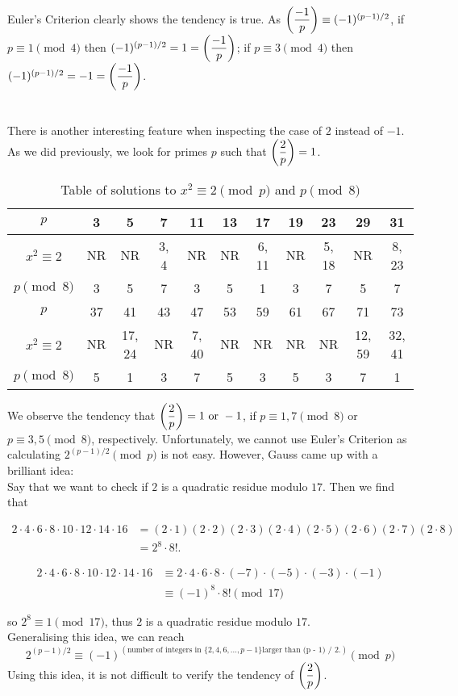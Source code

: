 \noindent
Euler's Criterion clearly shows the tendency is true. As $\left( \dfrac{-1}{p} \right) \equiv (-1)^{(p - 1) / 2}$, if $p\equiv 1\pmod{4}$ then $(-1)^{(p - 1) / 2} = 1 = \left( \dfrac{-1}{p} \right) $; if $p\equiv 3\pmod{4}$ then $(-1)^{(p - 1) / 2} = -1 = \left( \dfrac{-1}{p} \right) $. \\
\\
\\
There is another interesting feature when inspecting the case of $2$ instead of $-1$. As we did previously, we look for primes $p$ such that $\left( \dfrac{2}{p} \right)  = 1$.

\begin{table}[h!]
\centering
\begin{tabular}{|c||c c c c c c c c c c|} 
  \hline
  $p$ & 3 & 5 & 7 & 11 & 13 & 17 & 19 & 23 & 29 & 31 \\
  \hline
  $x^{2}\equiv 2$ & NR & NR & 3, 4 & NR & NR & 6, 11 & NR & 5, 18 & NR & 8, 23 \\ 
  \hline
  $p\pmod{8}$ & 3 & 5 & 7 & 3 & 5 & 1 & 3 & 7 & 5 & 7 \\
  \hline \hline
  $p$ & 37 & 41 & 43 & 47 & 53 & 59 & 61 & 67 & 71 & 73 \\
  \hline
  $x^{2}\equiv 2$ & NR & 17, 24 & NR & 7, 40 & NR & NR & NR & NR & 12, 59 & 32, 41 \\
  \hline
  $p\pmod{8}$ & 5 & 1 & 3 & 7 & 5 & 3 & 5 & 3 & 7 & 1 \\
  \hline
\end{tabular}
\caption{Table of solutions to $x^{2}\equiv 2\pmod{p}$ and $p\pmod{8}$}
\end{table}

\noindent
We observe the tendency that $\left( \dfrac{2}{p} \right)  = 1 \text{ or } -1$, if $p\equiv 1, 7\pmod{8}$ or $p\equiv 3, 5\pmod{8}$, respectively. Unfortunately, we cannot use Euler's Criterion as calculating $2^{(p - 1) / 2}\pmod{p}$ is not easy. However, Gauss came up with a brilliant idea: \\
Say that we want to check if $2$ is a quadratic residue modulo $17$. Then we find that 

\begin{align*}
2\cdot 4\cdot 6\cdot 8\cdot 10\cdot 12\cdot 14\cdot 16 &= (2\cdot 1)(2\cdot 2)(2\cdot 3)(2\cdot 4)(2\cdot 5)(2\cdot 6)(2\cdot 7)(2\cdot 8) \\
&= 2^{8} \cdot 8!.
\end{align*}

\begin{align*}
2\cdot 4\cdot 6\cdot 8\cdot 10\cdot 12\cdot 14\cdot 16 &\equiv 2\cdot 4\cdot 6\cdot 8\cdot (-7)\cdot (-5)\cdot (-3)\cdot (-1) \\
&\equiv (-1)^{8}\cdot 8! \pmod{17}
\end{align*}

so $2^{8}\equiv 1\pmod{17}$, thus $2$ is a quadratic residue modulo $17$. \\
Generalising this idea, we can reach \[2^{(p - 1) / 2}\equiv (-1)^{(\text{number of integers in }\{2, 4, 6, \dots , p - 1\} \text{larger than (p - 1) / 2.})} \pmod{p}\]
Using this idea, it is not difficult to verify the tendency of $\left( \dfrac{2}{p} \right) $.